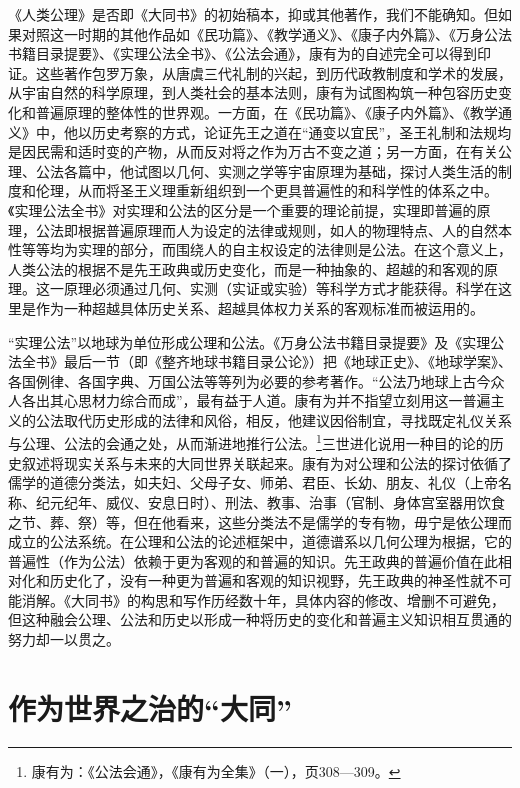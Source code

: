 \documentclass[a4paper, 12pt, openright]{ctexbook}
\begin{document}
《人类公理》是否即《大同书》的初始稿本，抑或其他著作，我们不能确知。但如果对照这一时期的其他作品如《民功篇》、《教学通义》、《康子内外篇》、《万身公法书籍目录提要》、《实理公法全书》、《公法会通》，康有为的自述完全可以得到印证。这些著作包罗万象，从唐虞三代礼制的兴起，到历代政教制度和学术的发展，从宇宙自然的科学原理，到人类社会的基本法则，康有为试图构筑一种包容历史变化和普遍原理的整体性的世界观。一方面，在《民功篇》、《康子内外篇》、《教学通义》中，他以历史考察的方式，论证先王之道在“通变以宜民”，圣王礼制和法规均是因民需和适时变的产物，从而反对将之作为万古不变之道；另一方面，在有关公理、公法各篇中，他试图以几何、实测之学等宇宙原理为基础，探讨人类生活的制度和伦理，从而将圣王义理重新组织到一个更具普遍性的和科学性的体系之中。《实理公法全书》对实理和公法的区分是一个重要的理论前提，实理即普遍的原理，公法即根据普遍原理而人为设定的法律或规则，如人的物理特点、人的自然本性等等均为实理的部分，而围绕人的自主权设定的法律则是公法。在这个意义上，人类公法的根据不是先王政典或历史变化，而是一种抽象的、超越的和客观的原理。这一原理必须通过几何、实测（实证或实验）等科学方式才能获得。科学在这里是作为一种超越具体历史关系、超越具体权力关系的客观标准而被运用的。

“实理公法”以地球为单位形成公理和公法。《万身公法书籍目录提要》及《实理公法全书》最后一节（即《整齐地球书籍目录公论》）把《地球正史》、《地球学案》、各国例律、各国字典、万国公法等等列为必要的参考著作。“公法乃地球上古今众人各出其心思材力综合而成”，最有益于人道。康有为并不指望立刻用这一普遍主义的公法取代历史形成的法律和风俗，相反，他建议因俗制宜，寻找既定礼仪关系与公理、公法的会通之处，从而渐进地推行公法。\footnote{康有为：《公法会通》，《康有为全集》（一），页308—309。}三世进化说用一种目的论的历史叙述将现实关系与未来的大同世界关联起来。康有为对公理和公法的探讨依循了儒学的道德分类法，如夫妇、父母子女、师弟、君臣、长幼、朋友、礼仪（上帝名称、纪元纪年、威仪、安息日时）、刑法、教事、治事（官制、身体宫室器用饮食之节、葬、祭）等，但在他看来，这些分类法不是儒学的专有物，毋宁是依公理而成立的公法系统。在公理和公法的论述框架中，道德谱系以几何公理为根据，它的普遍性（作为公法）依赖于更为客观的和普遍的知识。先王政典的普遍价值在此相对化和历史化了，没有一种更为普遍和客观的知识视野，先王政典的神圣性就不可能消解。《大同书》的构思和写作历经数十年，具体内容的修改、增删不可避免，但这种融会公理、公法和历史以形成一种将历史的变化和普遍主义知识相互贯通的努力却一以贯之。

\section{作为世界之治的“大同”}
\end{document}
